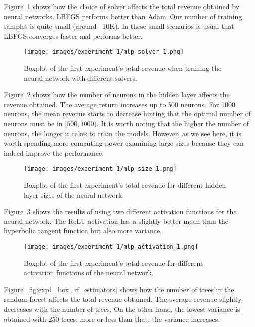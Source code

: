 Figure~\ref{fig:exp1_box_mlp_solver} shows how the choice of solver affects the total revenue obtained by  neural networks. LBFGS performs better than Adam. Our number of training samples is quite small (around ~10K). In these small scenarios is usual that LBFGS converges faster and performs better.

\begin{figure}
    \centering
    \texttt{[image: images/experiment\_1/mlp\_solver\_1.png]}
    \caption{\small Boxplot of the first experiment's total revenue when training the neural network with different solvers.}
    \label{fig:exp1_box_mlp_solver}
\end{figure}

Figure~\ref{fig:exp1_box_mlp_size} shows how the number of neurons in the hidden layer affects the revenue obtained. The average return increases up to 500 neurons. For 1000 neurons, the mean revenue starts to decrease hinting that the optimal number of neurons must be in $[500, 1000)$. It is worth noting that the higher the number of neurons, the longer it takes to train the models. However, as we see here, it is worth spending more computing power examining large sizes because they can indeed improve the performance.

\begin{figure}
    \centering
    \texttt{[image: images/experiment\_1/mlp\_size\_1.png]}
    \caption{\small Boxplot of the first experiment's total revenue for different hidden layer sizes of the neural network.}
    \label{fig:exp1_box_mlp_size}
\end{figure}


Figure~\ref{fig:exp1_box_mlp_activation} shows the results of using two different activation functions for the neural network. The ReLU activation has a slightly better mean than the hyperbolic tangent function but also more variance.

\begin{figure}
    \centering
    \texttt{[image: images/experiment\_1/mlp\_activation\_1.png]}
    \caption{\small Boxplot of the first experiment's total revenue for different activation functions of the neural network.}
    \label{fig:exp1_box_mlp_activation}
\end{figure}

Figure~\ref{fig:exp1_box_rf_estimators} shows how the number of trees in the random forest affects the total revenue obtained. The average revenue slightly decreases with the number of trees. On the other hand, the lowest variance is obtained with 250 trees, more or less than that, the variance increases. 

